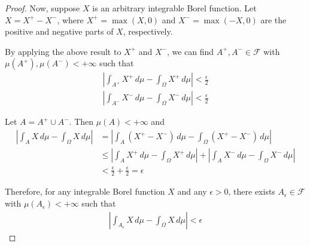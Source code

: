 \begin{proof}
    Now, suppose $X$ is an arbitrary integrable Borel function. Let $X = X^+ - X^-$, where $X^+ = \max(X, 0)$ and $X^- = \max(-X, 0)$ are the positive and negative parts of $X$, respectively.
    
    By applying the above result to $X^+$ and $X^-$, we can find $A^+, A^- \in \mathcal{F}$ with $\mu(A^+), \mu(A^-) < +\infty$ such that
    \begin{align*}
        \left|\int_{A^+} X^+ \, d\mu - \int_\Omega X^+ \, d\mu\right| < \frac{\epsilon}{2}\\
        \left|\int_{A^-} X^- \, d\mu - \int_\Omega X^- \, d\mu\right| < \frac{\epsilon}{2}
    \end{align*}
    
    Let $A = A^+ \cup A^-$. Then $\mu(A) < +\infty$ and
    \begin{align*}
        \left|\int_A X \, d\mu - \int_\Omega X \, d\mu\right| &= \left|\int_A (X^+ - X^-) \, d\mu - \int_\Omega (X^+ - X^-) \, d\mu\right|\\
        &\leq \left|\int_A X^+ \, d\mu - \int_\Omega X^+ \, d\mu\right| + \left|\int_A X^- \, d\mu - \int_\Omega X^- \, d\mu\right|\\
        &< \frac{\epsilon}{2} + \frac{\epsilon}{2} = \epsilon
    \end{align*}
    
    Therefore, for any integrable Borel function $X$ and any $\epsilon > 0$, there exists $A_\epsilon \in \mathcal{F}$ with $\mu(A_\epsilon) < +\infty$ such that
    \begin{align*}
        \left|\int_{A_\epsilon} X \, d\mu - \int_\Omega X \, d\mu\right| < \epsilon
    \end{align*}
    \end{proof}

